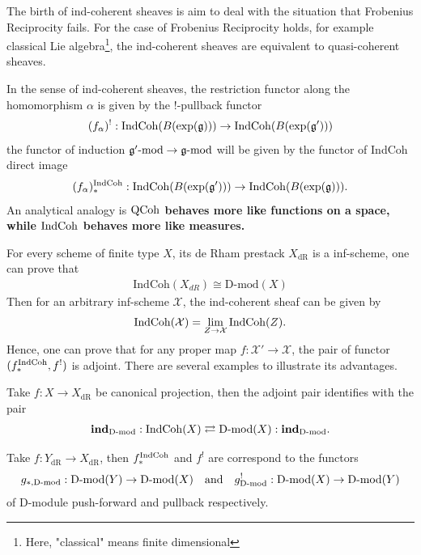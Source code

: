 {The birth of ind-coherent sheaves is aim to deal with the situation that Frobenius Reciprocity fails. For the case of Frobenius Reciprocity holds, for example classical Lie algebra\footnote{Here, "classical" means finite dimensional}, the ind-coherent sheaves are equivalent to quasi-coherent sheaves.

In the sense of ind-coherent sheaves, the restriction functor along the homomorphism $\alpha$ is given by the $!$-pullback functor
\begin{align*}
    (f_\alpha)^!:\operatorname{IndCoh}(B(\exp(\mathfrak{g})))\to \operatorname{IndCoh}(B(\exp(\mathfrak{g}')))
\end{align*} 
the functor of induction $\mathfrak{g}'\text{-mod}\to \mathfrak{g}\text{-mod}$ will be given by the functor of IndCoh direct image 
\begin{align*}
    (f_\alpha)_*^{\text{IndCoh}}:\operatorname{IndCoh}(B(\exp(\mathfrak{g}')))\to \operatorname{IndCoh}(B(\exp(\mathfrak{g}))).
\end{align*}
An analytical analogy is \textbf{\color{blue} $\operatorname{QCoh}$ behaves more like functions on a space, while $\operatorname{IndCoh}$ behaves more like measures.}

For every scheme of finite type $X$, its de Rham prestack $X_{\text{dR}}$ is a inf-scheme, one can prove that 
\begin{align*}
    \text{IndCoh}(X_{dR}) \cong \text{D-mod}(X)
\end{align*}
Then for an arbitrary inf-scheme $\mathcal{X}$, the ind-coherent sheaf can be given by 
\begin{align*}
    \operatorname{IndCoh}(\mathcal{X}) = \lim_{Z\to\mathcal{X}}\operatorname{IndCoh}(Z).
\end{align*}
Hence, one can prove that for any proper map $f:\mathcal{X}'\to\mathcal{X}$, the pair of functor $(f_*^{\operatorname{IndCoh}},f^!)$ is adjoint.
There are several examples to illustrate its advantages.
\begin{example}
    Take $f:X\to X_{\text{dR}}$ be canonical projection, then the adjoint pair identifies with the pair
    \begin{align*}
        \textbf{ind}_{\text{D-mod}}:\operatorname{IndCoh}(X)\rightleftarrows \operatorname{D-mod}(X): \textbf{ind}_{\operatorname{D-mod}}.
    \end{align*}
\end{example}
\begin{example}
    Take $f:Y_{\text{dR}}\to X_{\text{dR}}$, then $f_*^{\operatorname{IndCoh}}$ and $f^!$ are correspond to the functors
    \begin{align*}
        g_{*,\operatorname{D-mod}}:\operatorname{D-mod}(Y) \to \operatorname{D-mod}(X) \text{\quad and\quad}
        g_{\operatorname{D-mod}}^!:\operatorname{D-mod}(X) \to \operatorname{D-mod}(Y)
    \end{align*}
    of D-module push-forward and pullback respectively.
\end{example}

}
